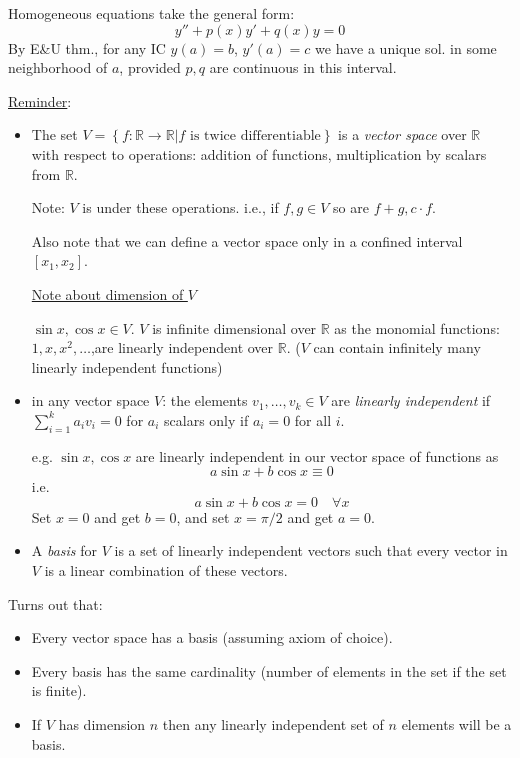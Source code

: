 \documentclass{article}
\newcommand{\mathpi}{\pi}
\newcommand{\tmem}[1]{{\em #1\/}}
\newcommand{\tmtextit}[1]{\text{{\itshape{#1}}}}
\begin{document}
Homogeneous equations take the general form:
\[ y'' + p (x) y' + q (x) y = 0 \]
By E\&U thm., for any IC $y (a) = b$, $y' (a) = c$ we have a unique sol. in
some neighborhood of $a$, provided $p, q$ are continuous in this interval.

\begin{tmornamented}
  {\underline{Reminder}}:
  \begin{itemize}
    \item The set $V = \left\{ f : \mathbb{R} \rightarrow \mathbb{R} | f
    \text{ is twice differentiable} \right\}$ is a {\tmem{vector space}} over
    $\mathbb{R}$ with respect to operations: addition of functions,
    multiplication by scalars from $\mathbb{R}$.
    
    Note: $V$ is \tmtextit{closed} under these operations. i.e., if $f, g \in
    V$ so are $f + g, c \cdot f$.
    
    Also note that we can define a vector space only in a confined interval
    $[x_1, x_2]$.
    
    {\underline{Note about dimension of $V$}}
    
    $\sin x, \cos x \in V$. $V$ is infinite dimensional over $\mathbb{R}$ as
    the monomial functions: $1, x, x^2, \ldots$,are linearly independent over
    $\mathbb{R}$. ($V$ can contain infinitely many linearly independent
    functions)
    
    \item in any vector space $V$: the elements $v_1, \ldots, v_k \in V$ are
    {\tmem{linearly independent}} if $\sum_{i = 1}^k a_i v_i = 0$ for $a_i$
    scalars only if $a_i = 0$ for all $i$.
    
    e.g. $\sin x, \cos x$ are linearly independent in our vector space of
    functions as
    \[ a \sin x + b \cos x \equiv 0 \]
    i.e.
    \[ a \sin x + b \cos x = 0 \quad \forall x \]
    Set $x = 0$ and get $b = 0$, and set $x = \mathpi / 2$ and get $a = 0$.
    
    \item A {\tmem{basis}} for $V$ is a set of linearly independent vectors
    such that every vector in $V$ is a linear combination of these vectors.
  \end{itemize}
  Turns out that:
  \begin{itemize}
    \item Every vector space has a basis (assuming axiom of choice).
    
    \item Every basis has the same cardinality (number of elements in the set
    if the set is finite).
    
    \item If $V$ has dimension $n$ then any linearly independent set of $n$
    elements will be a basis.
  \end{itemize}
\end{tmornamented}
\end{document}
